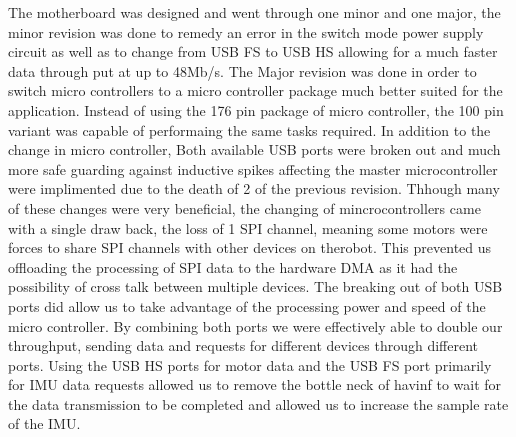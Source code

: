    The motherboard was designed and went through one minor and one major, the minor revision was done to remedy an error in the switch mode power supply circuit as well as to change from USB FS to USB HS allowing for a much faster data  through put at up to 48Mb/s.
 	The Major revision was done in order to switch micro controllers to a micro controller package much better suited for the application. Instead of using the 176 pin package of micro controller, the 100 pin variant was capable of performaing the same tasks required. In addition to the change in micro controller, Both available USB ports were broken out and much more safe guarding against inductive spikes affecting the master microcontroller were implimented due to the death of 2 of the previous revision. Thhough many of these changes were very beneficial, the changing of mincrocontrollers came with a single draw back, the loss of 1 SPI channel, meaning some motors were forces to share SPI channels with other devices on therobot. This prevented us offloading the processing of SPI data to the hardware DMA as it had the possibility of cross talk between multiple devices. The breaking out of both USB ports did allow us to take advantage of the processing power and speed of the micro controller. By combining both ports we were effectively able to double our throughput, sending data and requests for different devices through different ports. Using the USB HS ports for motor data and the USB FS port primarily for IMU data requests allowed us to remove the bottle neck of havinf to wait for the data transmission to be completed and allowed us to increase the sample rate of the IMU.

